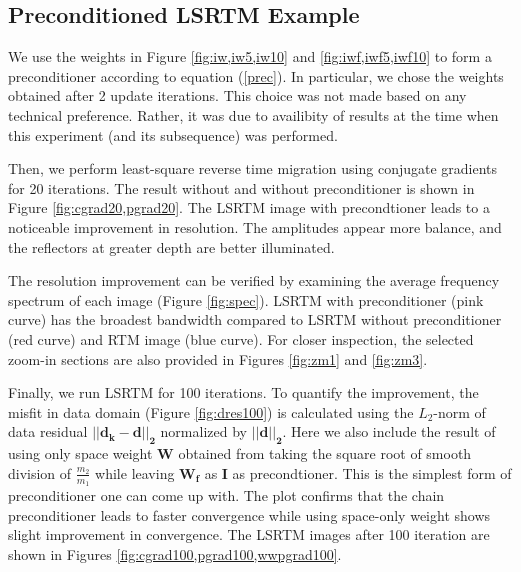 %

\subsection{Preconditioned LSRTM Example}
We use the weights in Figure \ref{fig:iw,iw5,iw10} and \ref{fig:iwf,iwf5,iwf10} to form a preconditioner according to equation (\ref{prec}). In particular, we chose the weights obtained after 2 update iterations. This choice was not made based on any technical preference. Rather, it was due to availibity of results at the time when this experiment (and its subsequence) was performed.

Then, we perform least-square reverse time migration using conjugate gradients for 20 iterations. The result without and without preconditioner is shown in Figure \ref{fig:cgrad20,pgrad20}. The LSRTM image with precondtioner leads to a noticeable improvement in resolution. The amplitudes appear more balance, and the reflectors at greater depth are better illuminated. 



The resolution improvement can be verified by examining the average frequency spectrum of each image (Figure \ref{fig:spec}). LSRTM with preconditioner (pink curve) has the broadest bandwidth compared to LSRTM without preconditioner (red curve) and RTM image (blue curve). For closer inspection, the selected zoom-in sections are also provided in Figures \ref{fig:zm1} and \ref{fig:zm3}.





Finally, we run LSRTM for 100 iterations. To quantify the improvement, the misfit in data domain (Figure \ref{fig:dres100}) is calculated using the $L_2$-norm of data residual $\mathbf{|| d_k - d ||_{2}}$ normalized by $\mathbf{||d ||_{2}}$. Here we also include the result of using only space weight $\mathbf{W}$ obtained from taking the square root of smooth division of $\frac{m_2}{m_1}$ while leaving $\mathbf{W_f}$ as $\mathbf{I}$ as precondtioner. This is the simplest form of preconditioner one can come up with.
The plot confirms that the chain preconditioner leads to faster convergence while using space-only weight shows slight improvement in convergence. The LSRTM images after 100 iteration are shown in Figures \ref{fig:cgrad100,pgrad100,wwpgrad100}. 

